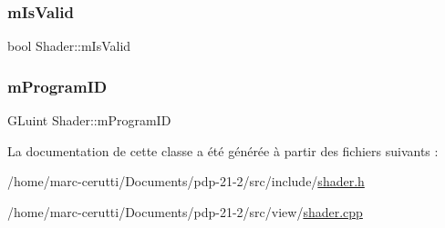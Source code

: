\subsubsection{\texorpdfstring{m\+Is\+Valid}{mIsValid}}
{\footnotesize\ttfamily bool Shader\+::m\+Is\+Valid\hspace{0.3cm}{\ttfamily [protected]}}

\mbox{\label{class_shader_ad3c569bb2c0755c647ca139863d44b55}} 
\subsubsection{\texorpdfstring{m\+Program\+ID}{mProgramID}}
{\footnotesize\ttfamily G\+Luint Shader\+::m\+Program\+ID\hspace{0.3cm}{\ttfamily [protected]}}



La documentation de cette classe a été générée à partir des fichiers suivants \+:\begin{DoxyCompactItemize}
\item 
/home/marc-\/cerutti/\+Documents/pdp-\/21-\/2/src/include/\hyperlink{shader_8h}{shader.\+h}\item 
/home/marc-\/cerutti/\+Documents/pdp-\/21-\/2/src/view/\hyperlink{shader_8cpp}{shader.\+cpp}\end{DoxyCompactItemize}
